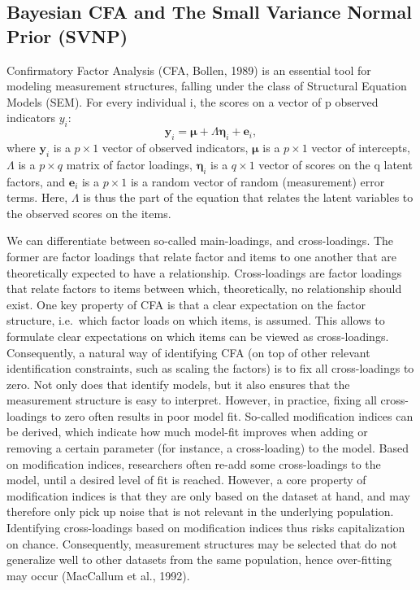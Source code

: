 \documentclass[
  man, donotrepeattitle,floatsintext]{apa6}
\begin{document}
\hypertarget{bayesian-cfa-and-the-small-variance-normal-prior-svnp}{%
\subsection{Bayesian CFA and The Small Variance Normal Prior (SVNP)}\label{bayesian-cfa-and-the-small-variance-normal-prior-svnp}}

Confirmatory Factor Analysis (CFA, Bollen, 1989) is an essential tool for modeling measurement structures, falling under the class of Structural Equation Models (SEM). For every individual i, the scores on a vector of p observed indicators \(y_i\):
\[\boldsymbol{y}_i = \boldsymbol{\mu} + \Lambda \boldsymbol{\eta}_i + \boldsymbol{e}_i ,\]
where \(\boldsymbol{y}_i\) is a \(p \times 1\) vector of observed indicators, \(\boldsymbol{\mu}\) is a \(p \times 1\) vector of intercepts, \(\Lambda\) is a \(p \times q\) matrix of factor loadings, \(\boldsymbol{\eta}_i\) is a \(q \times 1\) vector of scores on the q latent factors, and \(\boldsymbol{e}_i\) is a \(p \times 1\) is a random vector of random (measurement) error terms. Here, \(\Lambda\) is thus the part of the equation that relates the latent variables to the observed scores on the items.

We can differentiate between so-called main-loadings, and cross-loadings. The former are factor loadings that relate factor and items to one another that are theoretically expected to have a relationship. Cross-loadings are factor loadings that relate factors to items between which, theoretically, no relationship should exist. One key property of CFA is that a clear expectation on the factor structure, i.e.~which factor loads on which items, is assumed. This allows to formulate clear expectations on which items can be viewed as cross-loadings. Consequently, a natural way of identifying CFA (on top of other relevant identification constraints, such as scaling the factors) is to fix all cross-loadings to zero. Not only does that identify models, but it also ensures that the measurement structure is easy to interpret. However, in practice, fixing all cross-loadings to zero often results in poor model fit. So-called modification indices can be derived, which indicate how much model-fit improves when adding or removing a certain parameter (for instance, a cross-loading) to the model. Based on modification indices, researchers often re-add some cross-loadings to the model, until a desired level of fit is reached. However, a core property of modification indices is that they are only based on the dataset at hand, and may therefore only pick up noise that is not relevant in the underlying population. Identifying cross-loadings based on modification indices thus risks capitalization on chance. Consequently, measurement structures may be selected that do not generalize well to other datasets from the same population, hence over-fitting may occur (MacCallum et al., 1992).
\end{document}
